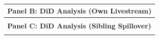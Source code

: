\begin{landscape}
\begin{table}[!ht]
\begin{tabular}{l*{12}{c}}
        \multicolumn{13}{l}{\textbf{Panel B\@: DiD Analysis (Own Livestream)}} \\
        \midrule
        \\
        \midrule
        
        \multicolumn{13}{l}{\textbf{Panel C\@: DiD Analysis (Sibling Spillover)}} \\
        \midrule
        \\
        \bottomrule
    \end{tabular}

    \egroup%

  \end{table}

\end{landscape}
